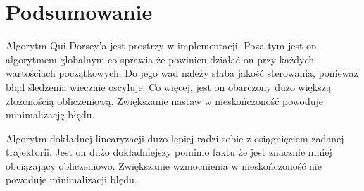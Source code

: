 \documentclass[12pt,a4paper]{article}
\begin{document}
\section{Podsumowanie}
  Algorytm Qui Dorsey’a jest prostrzy w implementacji. Poza tym jest on algorytmem globalnym co sprawia że powinien działać on przy każdych wartościach początkowych. Do jego wad należy słaba jakość sterowania, ponieważ błąd śledzenia wiecznie oscyluje. Co więcej, jest on obarczony dużo większą złożonością obliczeniową. Zwiększanie nastaw w nieskończoność powoduje minimalizację błędu.

  Algorytm dokładnej linearyzacji dużo lepiej radzi sobie z osiągnięciem zadanej trajektorii. Jest on dużo dokładniejszy pomimo faktu że jest znacznie mniej obciązający obliczeniowo. Zwiększanie wzmocnienia w nieskończoność nie powoduje minimalizacji błędu.
\end{document}
